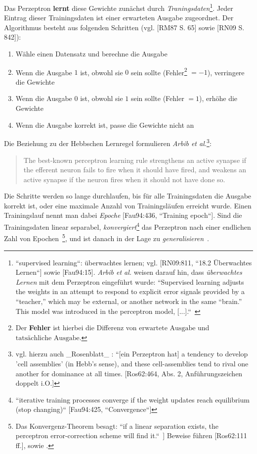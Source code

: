 Das Perzeptron \textbf{lernt} diese Gewichte zunächst durch \textit{Traningsdaten}\footnote{
    ``supervised learning``: überwachtes lernen; vgl. [RN09:811, ``18.2 Überwachtes Lernen``] sowie [Fau94:15]. \textit{Arbib et al.} weisen darauf hin, dass \textit{überwachtes Lernen} mit dem Perzeptron eingeführt wurde: ``Supervised learning adjusts the weights in an attempt to respond to explicit error signals provided by a “teacher,” which may be external, or another network in the same “brain.” This model was introduced in the perceptron model, [...].``~\cite[30]{Arb03}
}.
Jeder Eintrag dieser Trainingsdaten ist einer erwarteten Ausgabe zugeordnet. Der Algorithmus besteht aus folgenden Schritten (vgl. [RM87 S. 65] sowie [RN09 S. 842]):



\begin{enumerate}
    \item Wähle einen Datensatz und berechne die Ausgabe
    \item Wenn die Ausgabe $1$ ist, obwohl sie $0$ sein sollte (Fehler\footnote{
    Der \textbf{Fehler} ist hierbei die Differenz von $\text{erwartete Ausgabe}$ und $\text{tatsächliche Ausgabe}$.
    } $=-1$), verringere die Gewichte
    \item Wenn die Ausgabe $0$ ist, obwohl sie $1$ sein sollte  (Fehler $=1$), erhöhe die Gewichte
    \item Wenn die Ausgabe korrekt ist, passe die Gewichte nicht an
\end{enumerate}

\noindent
Die Beziehung zu der Hebbschen Lernregel formulieren \textit{Arbib et al.}\footnote{
    vgl. hierzu auch _Rosenblatt_ : ``[ein Perzeptron hat] a tendency to develop 'cell assemblies' (in Hebb's sense), and these cell-assemblies tend to rival one another for dominance at all times. [Ros62:464, Abs. 2, Anführungszeichen doppelt i.O.]
}:

\blockquote[{\cite[20]{Arb03}}]{
    The best-known perceptron learning rule strengthens an active synapse if the efferent neuron fails to fire when it should have fired, and weakens an active synapse if the neuron fires when it should not have done so.
}

\noindent
Die Schritte werden so lange durchlaufen, bis für alle Trainingsdaten die Ausgabe korrekt ist, oder eine maximale Anzahl von Trainingsläufen erreicht wurde.
Einen Trainingslauf nennt man dabei \textit{Epoche} [Fau94:436, ``Training epoch``].
Sind die Trainingsdaten linear separabel, \textit{konvergiert}\footnote{
    ``iterative training processes converge if the weight updates reach equilibrium (stop changing)`` [Fau94:425, ``Convergence``]
} das Perzeptron nach einer endlichen Zahl von Epochen~\cite[164]{MP88}\footnote{
    Das Konvergenz-Theorem besagt: ``if a linear separation exists, the perceptron error-correction scheme will find it.``~\cite[20]{Arb03}] Beweise führen [Ros62:111 ff.], \cite[168 ff.]{MP88} sowie \cite{Nov62}.
}, und ist danach in der Lage zu \textit{generalisieren}~\cite[202]{Ert21a}.\\

